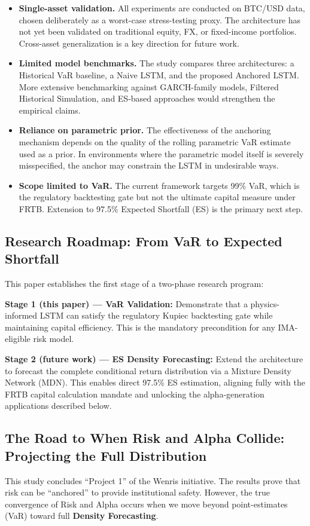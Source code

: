 \begin{itemize}
    \item \textbf{Single-asset validation.} All experiments are conducted on BTC/USD data, chosen deliberately as a worst-case stress-testing proxy. The architecture has not yet been validated on traditional equity, FX, or fixed-income portfolios. Cross-asset generalization is a key direction for future work.
    \item \textbf{Limited model benchmarks.} The study compares three architectures: a Historical VaR baseline, a Naive LSTM, and the proposed Anchored LSTM. More extensive benchmarking against GARCH-family models, Filtered Historical Simulation, and ES-based approaches would strengthen the empirical claims.
    \item \textbf{Reliance on parametric prior.} The effectiveness of the anchoring mechanism depends on the quality of the rolling parametric VaR estimate used as a prior. In environments where the parametric model itself is severely misspecified, the anchor may constrain the LSTM in undesirable ways.
    \item \textbf{Scope limited to VaR.} The current framework targets 99\% VaR, which is the regulatory backtesting gate but not the ultimate capital measure under FRTB. Extension to 97.5\% Expected Shortfall (ES) is the primary next step.
\end{itemize}

\subsection*{Research Roadmap: From VaR to Expected Shortfall}

This paper establishes the first stage of a two-phase research program:

\textbf{Stage 1 (this paper) --- VaR Validation:} Demonstrate that a physics-informed LSTM can satisfy the regulatory Kupiec backtesting gate while maintaining capital efficiency. This is the mandatory precondition for any IMA-eligible risk model.

\textbf{Stage 2 (future work) --- ES Density Forecasting:} Extend the architecture to forecast the complete conditional return distribution via a Mixture Density Network (MDN). This enables direct 97.5\% ES estimation, aligning fully with the FRTB capital calculation mandate and unlocking the alpha-generation applications described below.

\subsection*{The Road to When Risk and Alpha Collide: Projecting the Full Distribution}
This study concludes ``Project 1'' of the Wenris initiative. The results prove that risk can be ``anchored'' to provide institutional safety. However, the true convergence of Risk and Alpha occurs when we move beyond point-estimates (VaR) toward full \textbf{Density Forecasting}.

